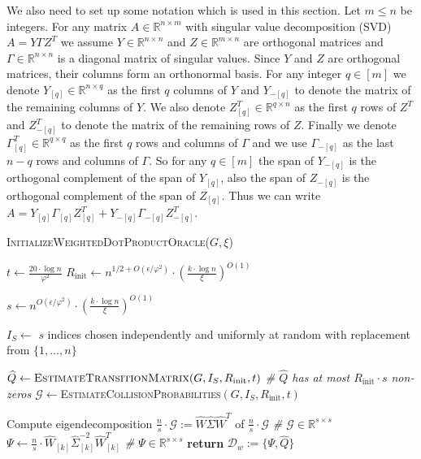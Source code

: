 \documentclass[letterpaper,11pt]{article}
\newcommand{\Q}{\widehat{Q}}
\newcommand{\cD}{\mathcal{D}}
\newcommand{\G}{\mathcal{G}}
\newcommand{\R}{\mathbb{R}}
\theoremstyle{plain}
\theoremstyle{definition}
\theoremstyle{remark}
\newcommand{\return}{\textbf{return }}
\begin{document}
We also need to set up some notation which is used in this section. Let $m\leq n$ be integers.  
For any matrix $A\in \R^{n\times m}$ with singular value decomposition (SVD) 
$A=Y\Gamma Z^T$ we assume $Y\in \R^{n\times n}$ and $Z\in \R^{m\times n}$ are orthogonal 
matrices and  $\Gamma \in \R^{n\times n}$ is a diagonal matrix of singular values. Since 
$Y$ and $Z$ are orthogonal matrices, their columns form an orthonormal basis. For any 
integer $q\in[m]$ we denote $Y_{[q]}\in \R^{n \times q}$ as the first $q$ columns of $Y$ 
and $Y_{-[q]}$ to denote the matrix of the remaining columns of $Y$.  We also denote 
$Z^T_{[q]}\in \R^{q \times n}$ as the first $q$ rows of $Z^T$ and $Z^T_{-[q]}$ to denote 
the matrix of the remaining rows of $Z$. Finally we denote $\Gamma^T_{[q]}\in \R^{q \times q}$ 
as the first $q$ rows and columns of $\Gamma$ and we use $\Gamma_{-[q]}$ as the last $n-q$ 
rows and columns of $\Gamma$. So for any $q\in[m]$ the span of $Y_{-[q]}$ is the orthogonal 
complement of the span of $Y_{[q]}$, also the span of $Z_{-[q]}$ is the orthogonal 
complement of the span of $Z_{[q]}$. Thus we can write 
$A=Y_{[q]}\Gamma_{[q]}Z^T_{[q]} + Y_{-[q]}\Gamma_{-[q]}Z^T_{-[q]}$.


\begin{algorithm}[H]
	\caption{\textsc{InitializeWeightedDotProductOracle($G,\xi$)}  
 } \label{alg:LearnEmbedding-tt}
\label{alg:LearnEmbedding}
\begin{algorithmic}[1]
	\STATE $t\gets \frac{20\cdot \log n}{\varphi^2}$	
\STATE $R_{\text{init}}\gets n^{1/2 + O(\epsilon / \varphi^2)} \cdot  \left(\frac{k\cdot \log n}{\xi}\right)^{O(1)}$	
	
	\STATE $s\gets n^{O(\epsilon / \varphi^2)} \cdot \left(\frac{k\cdot \log n}{\xi}\right)^{O(1)}$ \label{ln:sets} 
	
	\STATE  $I_S\gets $ $s$ indices chosen independently and uniformly at random with replacement from $\{1,\ldots,n\}$ \label{ln:sample}
	
\STATE ${\Q} \gets \textsc{EstimateTransitionMatrix}(G,I_S,R_{\text{init}},t)$  \textit{\qquad   \# $\Q$ has at most $R_{\text{init}}\cdot s$ non-zeros \label{ln:setQi}}
	\STATE $\G\gets$\textsc{EstimateCollisionProbabilities}$(G,I_S,R_{\text{init}},t)$ \label{ln:setG}

	\STATE Compute  eigendecomposition $\frac{n}{s}\cdot\G:=\widehat{W}\widehat{\Sigma} \widehat{W}^T$  of $\frac{n}{s}\cdot\G$ \textit{\qquad\qquad \qquad \qquad\qquad \# $\G\in \R^{s\times s}$ \label{ln:svdG}}
	\STATE $\Psi\gets \frac{n}{s}\cdot\widehat{W}_{[k]}\widehat{\Sigma}_{[k]}^{-2} \widehat{W}_{[k]}^T$ \textit{\qquad \qquad\qquad \qquad\qquad \qquad\qquad \qquad\qquad \qquad \qquad \qquad \# $\Psi\in\R^{s\times s}$} 
	\STATE \return   $\cD_w:=\{\Psi,\Q\}$
\end{algorithmic}
\end{algorithm}
\end{document}
